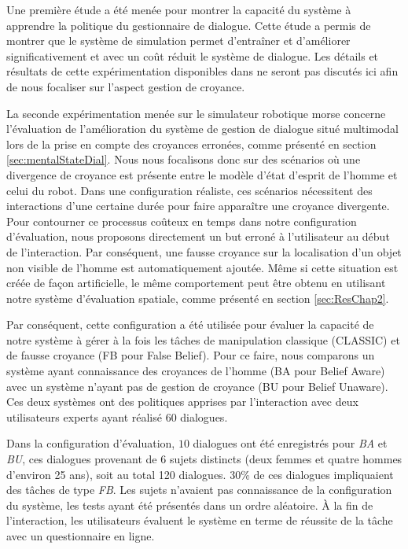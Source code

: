 \documentclass[a4paper,11pt,twoside]{StyleThese}
\begin{document}
Une première étude a été menée pour montrer la capacité du système à apprendre la politique du gestionnaire de dialogue. Cette étude a permis de montrer que le système de simulation permet d'entraîner et d'améliorer significativement et avec un coût réduit le système de dialogue. Les détails et résultats de cette expérimentation disponibles dans \cite{simpar_2014} ne seront pas discutés ici afin de nous focaliser sur l'aspect gestion de croyance.

La seconde expérimentation menée sur le simulateur robotique morse concerne l'évaluation de l'amélioration du système de gestion de dialogue situé multimodal lors de la prise en compte des croyances erronées, comme présenté en section \ref{sec:mentalStateDial}.
Nous nous focalisons donc sur des scénarios où une divergence de croyance est présente entre le modèle d'état d'esprit de l'homme et celui du robot. 
Dans une configuration réaliste, ces scénarios nécessitent des interactions d'une certaine durée pour faire apparaître une croyance divergente. Pour contourner ce processus coûteux en temps dans notre configuration d'évaluation, nous proposons directement un but erroné à l'utilisateur au début de l'interaction. 
Par conséquent, une fausse croyance sur la localisation d'un objet non visible de l'homme est automatiquement ajoutée. Même si cette situation est créée de façon artificielle, le même comportement peut être obtenu en utilisant notre système d'évaluation spatiale, comme présenté en section \ref{sec:ResChap2}.

Par conséquent, cette configuration a été utilisée pour évaluer la capacité de notre système à gérer à la fois les tâches de manipulation classique (CLASSIC) et de fausse croyance (FB pour False Belief).
Pour ce faire, nous comparons un système ayant connaissance des croyances de l'homme (BA pour Belief Aware) avec un système n'ayant pas de gestion de croyance (BU pour Belief Unaware). Ces deux systèmes ont des politiques apprises par l'interaction avec deux utilisateurs experts ayant réalisé $60$ dialogues.

Dans la configuration d'évaluation, $10$ dialogues ont été enregistrés pour \textit{BA} et \textit{BU}, ces dialogues provenant de 6 sujets distincts (deux femmes et quatre hommes d'environ 25 ans), soit au total 120 dialogues. $30$\% de ces dialogues impliquaient des tâches de type \textit{FB}. Les sujets n'avaient pas connaissance de la configuration du système, les tests ayant été présentés dans un ordre aléatoire. À la fin de l'interaction, les utilisateurs évaluent le système en terme de réussite de la tâche avec un questionnaire en ligne.
\end{document}
